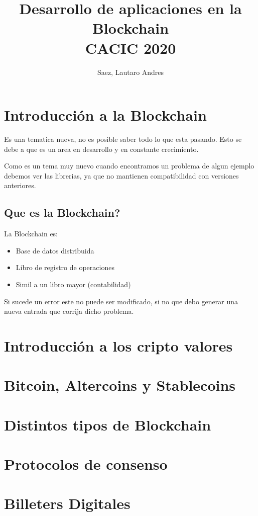 \documentclass[]{book}
\title{Desarrollo de aplicaciones en la Blockchain \\ CACIC 2020}
\author{Saez, Lautaro Andres}
\date{}
\begin{document}
    \maketitle
    \tableofcontents
    \chapter{ Introducción a la Blockchain }

    Es una tematica nueva, no es posible saber todo lo que esta pasando. Esto se 
    debe a que es un area en desarrollo y en constante crecimiento.

    Como es un tema muy nuevo cuando encontramos un problema de algun ejemplo 
    debemos ver las librerias, ya que no mantienen compatibilidad con versiones anteriores.

    \section{Que es la Blockchain?}

    La Blockchain es: 

    \begin{itemize}
        \item Base de datos distribuida
        \item Libro de registro de operaciones
        \item Simil a un libro mayor (contabilidad)
    \end{itemize}

    Si sucede un error este no puede ser modificado, si no que debo generar una nueva entrada 
    que corrija dicho problema.

    \chapter{ Introducción a los cripto valores }
    \chapter{ Bitcoin, Altercoins y Stablecoins }
    \chapter{ Distintos tipos de Blockchain }
    \chapter{ Protocolos de consenso }
    \chapter{ Billeters Digitales }
\end{document}
